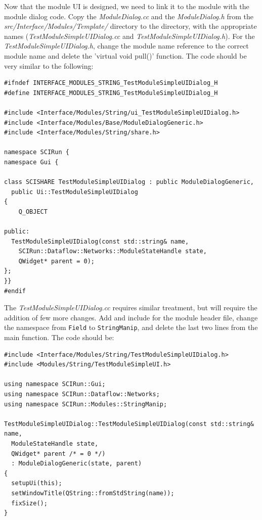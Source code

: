 \documentclass[fleqn,11pt,openany]{book}
\begin{document}
Now that the module UI is designed, we need to link it to the module with the module dialog code.
Copy the \emph{ModuleDialog.cc} and the \emph{ModuleDialog.h} from the \emph{src/Interface/Modules/Template/} directory to the \emph{} directory, with the appropriate names (\emph{TestModuleSimpleUIDialog.cc} and \emph{TestModuleSimpleUIDialog.h}).
For the \emph{TestModuleSimpleUIDialog.h}, change the module name reference to the correct module name and delete the 'virtual void pull()' function.  The code should be very similar to the following:
\begin{verbatim}
#ifndef INTERFACE_MODULES_STRING_TestModuleSimpleUIDialog_H
#define INTERFACE_MODULES_STRING_TestModuleSimpleUIDialog_H

#include <Interface/Modules/String/ui_TestModuleSimpleUIDialog.h>
#include <Interface/Modules/Base/ModuleDialogGeneric.h>
#include <Interface/Modules/String/share.h>

namespace SCIRun {
namespace Gui {
  
class SCISHARE TestModuleSimpleUIDialog : public ModuleDialogGeneric,
  public Ui::TestModuleSimpleUIDialog
{
	Q_OBJECT
	
public:
  TestModuleSimpleUIDialog(const std::string& name,
    SCIRun::Dataflow::Networks::ModuleStateHandle state,                                                                                                                                                                                                                                                                                                                                                                                                                                                                                                                                                                                                                                                                              
    QWidget* parent = 0);
};
}}
#endif
\end{verbatim}
The \emph{TestModuleSimpleUIDialog.cc} requires similar treatment, but will require the addition of few more changes.  Add and include for the module header file, change the namespace from \verb|Field| to \verb|StringManip|, and delete the last two lines from the main function.
The code should be:
\begin{verbatim}
#include <Interface/Modules/String/TestModuleSimpleUIDialog.h>
#include <Modules/String/TestModuleSimpleUI.h>

using namespace SCIRun::Gui;
using namespace SCIRun::Dataflow::Networks;
using namespace SCIRun::Modules::StringManip;

TestModuleSimpleUIDialog::TestModuleSimpleUIDialog(const std::string& name,
  ModuleStateHandle state,
  QWidget* parent /* = 0 */)
  : ModuleDialogGeneric(state, parent)
{
  setupUi(this);
  setWindowTitle(QString::fromStdString(name));
  fixSize();
}
\end{verbatim}
\end{document}
